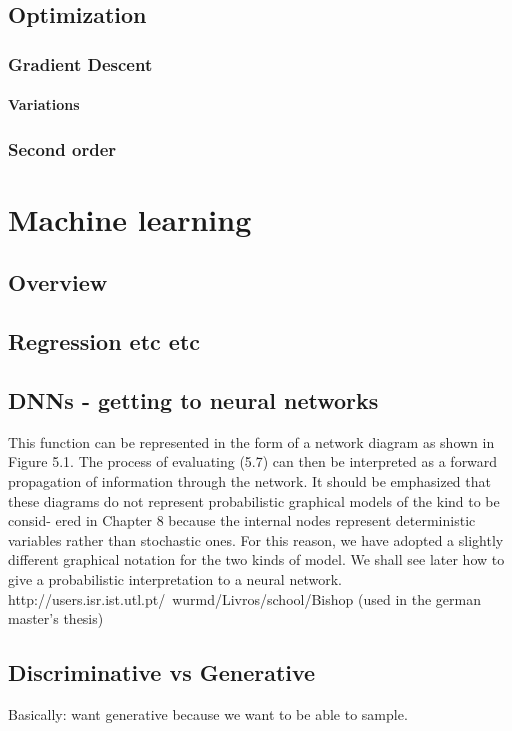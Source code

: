 \documentclass[twoside,english]{uiofysmaster}
\begin{document}
\section{Optimization}
\subsection{Gradient Descent}
\subsubsection{Variations}
\subsection{Second order}



\chapter{Machine learning}
\section{Overview}
\section{Regression etc etc}
\section{DNNs - getting to neural networks}
This function can be represented in the form of a network diagram as shown in Figure 5.1. The process of evaluating (5.7) can then be interpreted as a forward propagation of information through the network. It should be emphasized that these diagrams do not represent probabilistic graphical models of the kind to be consid- ered in Chapter 8 because the internal nodes represent deterministic variables rather than stochastic ones. For this reason, we have adopted a slightly different graphical notation for the two kinds of model. We shall see later how to give a probabilistic interpretation to a neural network.
http://users.isr.ist.utl.pt/~wurmd/Livros/school/Bishop%
\cite{Bishop2006} (used in the german master's thesis)


\section{Discriminative vs Generative}
Basically: want generative because we want to be able to sample.
\end{document}
